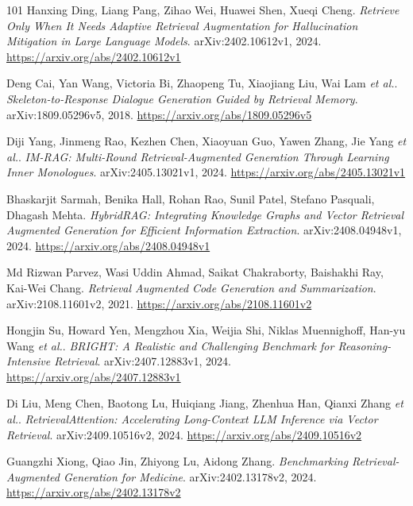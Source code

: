 \documentclass[11pt,a4paper]{article}
\begin{document}
\begin{thebibliography}{101}
Hanxing Ding, Liang Pang, Zihao Wei, Huawei Shen, Xueqi Cheng.
\newblock \emph{Retrieve Only When It Needs Adaptive Retrieval Augmentation for Hallucination Mitigation in Large Language Models}.
\newblock arXiv:2402.10612v1, 2024.
\newblock \url{https://arxiv.org/abs/2402.10612v1}

Deng Cai, Yan Wang, Victoria Bi, Zhaopeng Tu, Xiaojiang Liu, Wai Lam \emph{et al.}.
\newblock \emph{Skeleton-to-Response Dialogue Generation Guided by Retrieval Memory}.
\newblock arXiv:1809.05296v5, 2018.
\newblock \url{https://arxiv.org/abs/1809.05296v5}

Diji Yang, Jinmeng Rao, Kezhen Chen, Xiaoyuan Guo, Yawen Zhang, Jie Yang \emph{et al.}.
\newblock \emph{IM-RAG: Multi-Round Retrieval-Augmented Generation Through Learning Inner Monologues}.
\newblock arXiv:2405.13021v1, 2024.
\newblock \url{https://arxiv.org/abs/2405.13021v1}

Bhaskarjit Sarmah, Benika Hall, Rohan Rao, Sunil Patel, Stefano Pasquali, Dhagash Mehta.
\newblock \emph{HybridRAG: Integrating Knowledge Graphs and Vector Retrieval Augmented Generation for Efficient Information Extraction}.
\newblock arXiv:2408.04948v1, 2024.
\newblock \url{https://arxiv.org/abs/2408.04948v1}

Md Rizwan Parvez, Wasi Uddin Ahmad, Saikat Chakraborty, Baishakhi Ray, Kai-Wei Chang.
\newblock \emph{Retrieval Augmented Code Generation and Summarization}.
\newblock arXiv:2108.11601v2, 2021.
\newblock \url{https://arxiv.org/abs/2108.11601v2}

Hongjin Su, Howard Yen, Mengzhou Xia, Weijia Shi, Niklas Muennighoff, Han-yu Wang \emph{et al.}.
\newblock \emph{BRIGHT: A Realistic and Challenging Benchmark for Reasoning-Intensive Retrieval}.
\newblock arXiv:2407.12883v1, 2024.
\newblock \url{https://arxiv.org/abs/2407.12883v1}

Di Liu, Meng Chen, Baotong Lu, Huiqiang Jiang, Zhenhua Han, Qianxi Zhang \emph{et al.}.
\newblock \emph{RetrievalAttention: Accelerating Long-Context LLM Inference via Vector Retrieval}.
\newblock arXiv:2409.10516v2, 2024.
\newblock \url{https://arxiv.org/abs/2409.10516v2}

Guangzhi Xiong, Qiao Jin, Zhiyong Lu, Aidong Zhang.
\newblock \emph{Benchmarking Retrieval-Augmented Generation for Medicine}.
\newblock arXiv:2402.13178v2, 2024.
\newblock \url{https://arxiv.org/abs/2402.13178v2}


\end{thebibliography}
\end{document}
